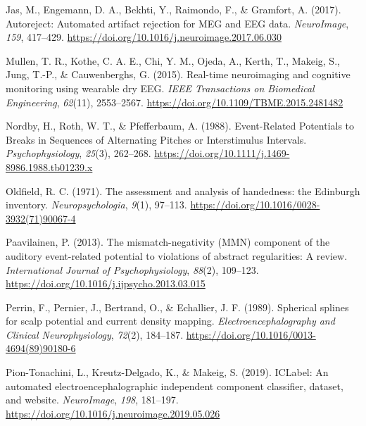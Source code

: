 \documentclass[stu,a4paper,11pt,floatsintext]{apa7}
\newenvironment{cslreferences}%
  {\setlength{\parindent}{0pt}%
  \everypar{\setlength{\hangindent}{\cslhangindent}}\ignorespaces}%
  {\par}
\newlength{\cslhangindent}
\begin{document}
\begin{cslreferences}
\leavevmode\hypertarget{ref-jasAutorejectAutomatedArtifact2017}{}%
Jas, M., Engemann, D. A., Bekhti, Y., Raimondo, F., \& Gramfort, A.
(2017). Autoreject: Automated artifact rejection for MEG and EEG data.
\emph{NeuroImage}, \emph{159}, 417--429.
\url{https://doi.org/10.1016/j.neuroimage.2017.06.030}

\leavevmode\hypertarget{ref-mullenRealtimeNeuroimagingCognitive2015}{}%
Mullen, T. R., Kothe, C. A. E., Chi, Y. M., Ojeda, A., Kerth, T.,
Makeig, S., Jung, T.-P., \& Cauwenberghs, G. (2015). Real-time
neuroimaging and cognitive monitoring using wearable dry EEG. \emph{IEEE
Transactions on Biomedical Engineering}, \emph{62}(11), 2553--2567.
\url{https://doi.org/10.1109/TBME.2015.2481482}

\leavevmode\hypertarget{ref-nordbyEventRelatedPotentialsBreaks1988}{}%
Nordby, H., Roth, W. T., \& Pfefferbaum, A. (1988). Event-Related
Potentials to Breaks in Sequences of Alternating Pitches or
Interstimulus Intervals. \emph{Psychophysiology}, \emph{25}(3),
262--268. \url{https://doi.org/10.1111/j.1469-8986.1988.tb01239.x}

\leavevmode\hypertarget{ref-oldfieldAssessmentAnalysisHandedness1971}{}%
Oldfield, R. C. (1971). The assessment and analysis of handedness: the
Edinburgh inventory. \emph{Neuropsychologia}, \emph{9}(1), 97--113.
\url{https://doi.org/10.1016/0028-3932(71)90067-4}

\leavevmode\hypertarget{ref-paavilainenMismatchnegativityMMNComponent2013a}{}%
Paavilainen, P. (2013). The mismatch-negativity (MMN) component of the
auditory event-related potential to violations of abstract regularities:
A review. \emph{International Journal of Psychophysiology},
\emph{88}(2), 109--123.
\url{https://doi.org/10.1016/j.ijpsycho.2013.03.015}

\leavevmode\hypertarget{ref-perrinSphericalSplinesScalp1989}{}%
Perrin, F., Pernier, J., Bertrand, O., \& Echallier, J. F. (1989).
Spherical splines for scalp potential and current density mapping.
\emph{Electroencephalography and Clinical Neurophysiology},
\emph{72}(2), 184--187.
\url{https://doi.org/10.1016/0013-4694(89)90180-6}

\leavevmode\hypertarget{ref-pion-tonachiniICLabelAutomatedElectroencephalographic2019}{}%
Pion-Tonachini, L., Kreutz-Delgado, K., \& Makeig, S. (2019). ICLabel:
An automated electroencephalographic independent component classifier,
dataset, and website. \emph{NeuroImage}, \emph{198}, 181--197.
\url{https://doi.org/10.1016/j.neuroimage.2019.05.026}


\end{cslreferences}
\end{document}
